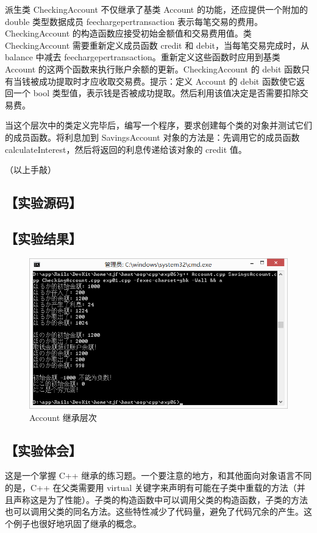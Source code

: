派生类 CheckingAccount 不仅继承了基类 Account 的功能，还应提供一个附加的 double 类型数据成员 feechargepertransaction 表示每笔交易的费用。CheckingAccount 的构造函数应接受初始金额值和交易费用值。类 CheckingAccount 需要重新定义成员函数 credit 和 debit，当每笔交易完成时，从 balance 中减去 feechargepertransaction。重新定义这些函数时应用到基类 Account 的这两个函数来执行账户余额的更新。CheckingAccount 的 debit 函数只有当钱被成功提取时才应收取交易费。提示：定义 Account 的 debit 函数使它返回一个 bool 类型值，表示钱是否被成功提取。然后利用该值决定是否需要扣除交易费。

当这个层次中的类定义完毕后，编写一个程序，要求创建每个类的对象并测试它们的成员函数。将利息加到 SavingsAccount 对象的方法是：先调用它的成员函数 calculateInterest，然后将返回的利息传递给该对象的 credit 值。

（以上手敲）
\subsection*{【实验源码】}
{\linespread{1}







}
\subsection*{【实验结果】}
\begin{figure}[htp]
\centering
\includegraphics[width=\textwidth]{exp06/exp01.png}
\caption{\label{out06_01}Account 继承层次}
\end{figure}
\subsection*{【实验体会】}
这是一个掌握 C++ 继承的练习题。一个要注意的地方，和其他面向对象语言不同的是，C++ 在父类需要用 virtual 关键字来声明有可能在子类中重载的方法（并且声称这是为了性能）。子类的构造函数中可以调用父类的构造函数，子类的方法也可以调用父类的同名方法。这些特性减少了代码量，避免了代码冗余的产生。这个例子也很好地巩固了继承的概念。
